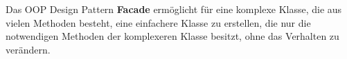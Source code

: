 Das OOP Design Pattern \textbf{Facade} ermöglicht für eine komplexe Klasse, die aus vielen Methoden besteht, 
eine einfachere Klasse zu erstellen, 
die nur die notwendigen Methoden der komplexeren Klasse besitzt, ohne das Verhalten zu verändern.